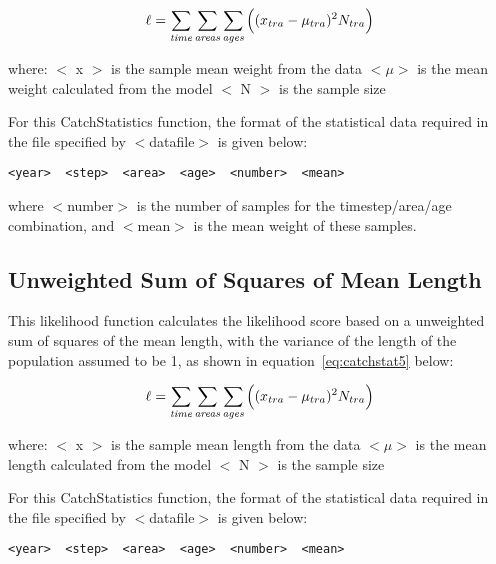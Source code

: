 \documentclass[10pt,twoside]{book}
\begin{document}
\begin{equation}\label{eq:catchstat4}
\ell = \sum_{\it time}\sum_{\it areas}\sum_{\it ages} \Big((x_{tra}-\mu_{tra})^2 N_{tra}\Big)
\end{equation}

where:\newline
$<$ x $>$ is the sample mean weight from the data\newline
$<\mu>$ is the mean weight calculated from the model\newline
$<$ N $>$ is the sample size

\bigskip
For this CatchStatistics function, the format of the statistical data required in the file specified by $<$datafile$>$ is given below:

{\small\begin{verbatim}
<year>  <step>  <area>  <age>  <number>  <mean>
\end{verbatim}}

where $<$number$>$ is the number of samples for the timestep/area/age combination, and $<$mean$>$ is the mean weight of these samples.

\subsection{Unweighted Sum of Squares of Mean Length}
This likelihood function calculates the likelihood score based on a unweighted sum of squares of the mean length, with the variance of the length of the population assumed to be 1, as shown in equation~\ref{eq:catchstat5} below:

\begin{equation}\label{eq:catchstat5}
\ell = \sum_{\it time}\sum_{\it areas}\sum_{\it ages} \Big((x_{tra}-\mu_{tra})^2 N_{tra}\Big)
\end{equation}

where:\newline
$<$ x $>$ is the sample mean length from the data\newline
$<\mu>$ is the mean length calculated from the model\newline
$<$ N $>$ is the sample size

\bigskip
For this CatchStatistics function, the format of the statistical data required in the file specified by $<$datafile$>$ is given below:

{\small\begin{verbatim}
<year>  <step>  <area>  <age>  <number>  <mean>
\end{verbatim}}
\end{document}

